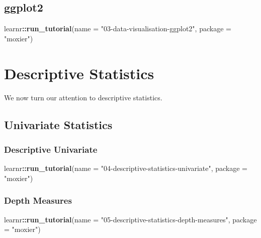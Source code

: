 \documentclass[]{book}
\newenvironment{Shaded}{\begin{snugshade}}{\end{snugshade}}
\newcommand{\KeywordTok}[1]{\textcolor[rgb]{0.13,0.29,0.53}{\textbf{#1}}}
\newcommand{\DataTypeTok}[1]{\textcolor[rgb]{0.13,0.29,0.53}{#1}}
\newcommand{\StringTok}[1]{\textcolor[rgb]{0.31,0.60,0.02}{#1}}
\newcommand{\OperatorTok}[1]{\textcolor[rgb]{0.81,0.36,0.00}{\textbf{#1}}}
\newcommand{\NormalTok}[1]{#1}
\begin{document}
\section{\texorpdfstring{\textbf{ggplot2}}{ggplot2}}\label{ggplot2}

\begin{Shaded}
\begin{Highlighting}[]
\NormalTok{learnr}\OperatorTok{::}\KeywordTok{run_tutorial}\NormalTok{(}\DataTypeTok{name =} \StringTok{"03-data-visualisation-ggplot2"}\NormalTok{,}
                     \DataTypeTok{package =} \StringTok{"moxier"}\NormalTok{)}
\end{Highlighting}
\end{Shaded}

\chapter{Descriptive Statistics}\label{descriptive-statistics}

We now turn our attention to descriptive statistics.

\section{Univariate Statistics}\label{univariate-statistics}

\subsection{Descriptive Univariate}\label{descriptive-univariate}

\begin{Shaded}
\begin{Highlighting}[]
\NormalTok{learnr}\OperatorTok{::}\KeywordTok{run_tutorial}\NormalTok{(}\DataTypeTok{name =} \StringTok{"04-descriptive-statistics-univariate"}\NormalTok{,}
                     \DataTypeTok{package =} \StringTok{"moxier"}\NormalTok{)}
\end{Highlighting}
\end{Shaded}

\subsection{Depth Measures}\label{depth-measures}

\begin{Shaded}
\begin{Highlighting}[]
\NormalTok{learnr}\OperatorTok{::}\KeywordTok{run_tutorial}\NormalTok{(}\DataTypeTok{name =} \StringTok{"05-descriptive-statistics-depth-measures"}\NormalTok{,}
                     \DataTypeTok{package =} \StringTok{"moxier"}\NormalTok{)}
\end{Highlighting}
\end{Shaded}
\end{document}
